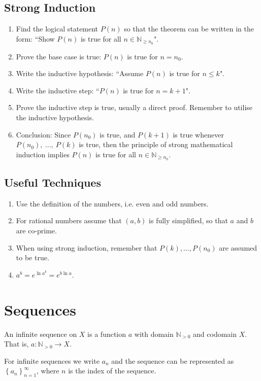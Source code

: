 \documentclass{article}
\newcommand*{\N}{\mathbb{N}}
\theoremstyle{plain}
\numberwithin{theorem}{subsection}
\theoremstyle{definition}
\numberwithin{definition}{subsection}
\theoremstyle{remark}
\numberwithin{note}{section}
\begin{document}
\subsection{Strong Induction}
\begin{enumerate}
    \item Find the logical statement $P(n)$ so that the theorem can be written in the form: ``Show $P(n)$ is true for all $n \in \N_{\geqslant n_0}$".
    \item Prove the base case is true: $P(n)$ is true for $n=n_0$.
    \item Write the inductive hypothesis: ``Assume $P(n)$ is true for $n\leqslant k$".
    \item Write the inductive step: ``$P(n)$ is true for $n=k+1$".
    \item Prove the inductive step is true, usually a direct proof. Remember to utilise the inductive hypothesis.
    \item Conclusion: Since $P(n_0)$ is true, and $P(k+1)$ is true whenever $P(n_0),\: \ldots,\: P(k)$ is true, then the principle of strong mathematical induction implies $P(n)$ is true for all $n\in \N_{\geqslant n_0}$.
\end{enumerate}
%
\subsection{Useful Techniques}
\begin{enumerate}
    \item Use the definition of the numbers, i.e. even and odd numbers.
    \item For rational numbers assume that $(a,b)$ is fully simplified, so that $a$ and $b$ are co-prime.
    \item When using strong induction, remember that $P(k), \ldots, P(n_0)$ are assumed to be true.
    \item $a^b=e^{\ln{a^b}}=e^{b\ln{a}}$.
\end{enumerate}
%
\section{Sequences}
An infinite sequence on $X$ is a function $a$ with domain $\N_{> 0}$ and codomain $X$. That is, $a:\N_{> 0}\to X$.

For infinite sequences we write $a_n$ and the sequence can be represented as $\left\{a_n\right\}_{n=1}^\infty$, where $n$ is the index of the sequence.
%
\end{document}
